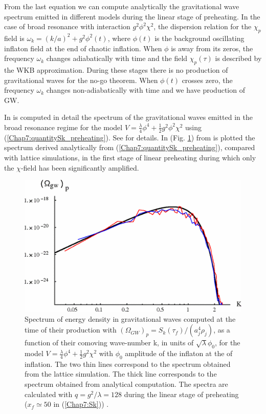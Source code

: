\documentclass[11pt,a4paper,twoside]{book}
\begin{document}
From the last equation we can compute analytically the gravitational wave spectrum emitted in different models during the linear stage of preheating. In the case of broad resonance with interaction $ g^{2}\phi^{2}\chi^{2} $, the dispersion relation for the $\chi_{p}$ field is $ \omega_{k}=(k/a)^{2}+g^{2}\phi^{2}(t) $, where $\phi(t)$ is the background oscillating inflaton field at the end of chaotic inflation. When $\phi$ is away from its zeros, the frequency $\omega_{k}$ changes adiabatically with time and the field $\chi_{p}(\tau)$ is described by the WKB approximation. During these stages there is no production of gravitational waves for the no-go theorem. When $\phi(t)$ crosses zero, the frequency $\omega_{k}$ changes non-adiabatically with time and we have production of GW.

In \cite{Chap7:GreenMethod} is computed in detail the spectrum of the gravitational waves  emitted in the broad resonance regime for the model $ V=\frac{\lambda}{4}\phi^{4} + \frac{1}{2}g^{2}\phi^{2}\chi^{2} $ using (\ref{Chap7:quantitySk_preheating}). See \cite{Chap7:GreenMethod} for details. In (Fig. \ref{fig:greenmethodfig10}) from \cite{Chap7:GreenMethod} is plotted the spectrum derived analytically from (\ref{Chap7:quantitySk_preheating}), compared with lattice simulations, in the first stage of linear preheating during which only the $\chi$-field has been significantly amplified.
\begin{figure}
	\centering
	\includegraphics[width=0.65\linewidth, height=0.3\textheight]{Images/Chap7/GreenMethod_Fig10}
	\caption{Spectrum of energy density in gravitational waves computed at the time of their production with $(\Omega_{GW})_{p}= S_{k}(\tau_{f})/(a^{4}_{j}\rho_{j}) $, as a function of their comoving wave-number k, in units of $ \sqrt{\lambda} \phi_{0} $, for the model $ V=\frac{\lambda}{4}\phi^{4} + \frac{1}{2}g^{2}\chi^{2} $ with $\phi_{0}$  amplitude of the inflaton at the of inflation. The two thin lines correspond to the spectrum obtained from the lattice simulation. The thick line corresponds to the spectrum obtained from analytical computation. The spectra are calculated with $ q=g^{2}/\lambda=128 $ during the linear stage of preheating ($ x_{f}\simeq 50 $ in (\ref{Chap7:Sk})) \cite{Chap7:GreenMethod}.}
	\label{fig:greenmethodfig10}
\end{figure}
\end{document}
